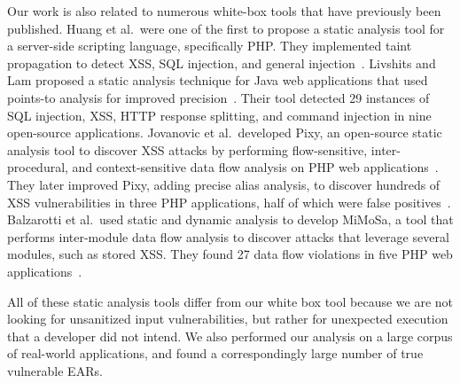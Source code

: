 Our work is also related to numerous white-box tools that have previously
been published. Huang et al.\ were one of the first to propose a static
analysis tool for a server-side scripting language, specifically PHP. They
implemented taint propagation to detect XSS, SQL injection, and general
injection~\cite{huang04:securing}. Livshits and Lam proposed a static
analysis technique for Java web applications that used points-to analysis
for improved precision~\cite{livshits05:java-static}. Their tool detected
29 instances of SQL injection, XSS, HTTP response splitting, and command
injection in nine open-source applications. Jovanovic et al.\ developed
Pixy, an open-source static analysis tool to discover XSS attacks by
performing flow-sensitive, inter-procedural, and context-sensitive data flow
analysis on PHP web applications~\cite{jovanovic06:pixy-improved}. They
later improved Pixy, adding precise alias analysis, to discover hundreds of
XSS vulnerabilities in three PHP applications, half of which were false
positives~\cite{jovanovic06:pixy-short}. Balzarotti et al.\ used static and
dynamic analysis to develop MiMoSa, a tool that performs inter-module data
flow analysis to discover attacks that leverage several modules, such as
stored XSS. They found 27 data flow violations in five PHP web
applications~\cite{balzarotti07:mimosa}.

All of these static analysis tools differ from our white box tool
because we are not looking for unsanitized input
vulnerabilities, but rather for unexpected execution that a developer
did not intend. We also performed our analysis on a large corpus of
real-world applications, and found a correspondingly large number of true
vulnerable EARs.
